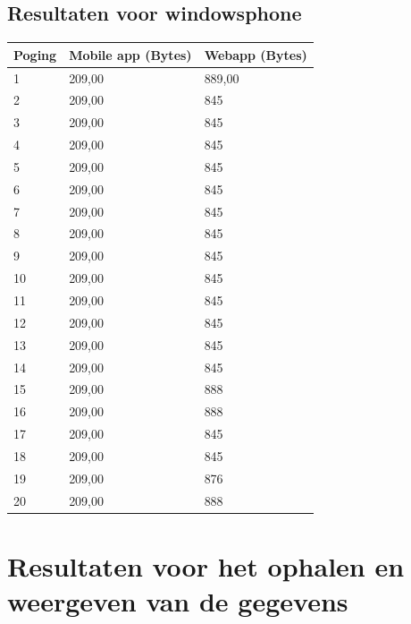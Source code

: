 \documentclass[pdftex,a4paper,12pt,twoside]{report}
\begin{document}
\subsection{Resultaten voor windowsphone}
\begin{center}
  \begin{tabular}{ | l | l | l |}
      \hline
      Poging & Mobile app (Bytes) & Webapp (Bytes)
      \\ \hline
      1 & 209,00 & 889,00
      \\ \hline
      2 & 209,00 & 845
      \\ \hline
      3 & 209,00 & 845
      \\ \hline
      4 & 209,00 & 845
      \\ \hline
      5 & 209,00 & 845
      \\ \hline
      6 & 209,00 & 845
      \\ \hline
      7 & 209,00 & 845
      \\ \hline
      8 & 209,00 & 845
      \\ \hline
      9 & 209,00 & 845
      \\ \hline
      10 & 209,00 & 845
      \\ \hline
      11 & 209,00 & 845
      \\ \hline
      12 & 209,00 & 845
      \\ \hline
      13 & 209,00 & 845
      \\ \hline
      14 & 209,00 & 845
      \\ \hline
      15 & 209,00 & 888
      \\ \hline
      16 & 209,00 & 888
      \\ \hline
      17 & 209,00 & 845
      \\ \hline
      18 & 209,00 & 845
      \\ \hline
      19 & 209,00 & 876
      \\ \hline
      20 & 209,00 & 888
      \\ \hline
  \end{tabular}
\end{center}
\newpage
\section{Resultaten voor het ophalen en weergeven van de gegevens}
\end{document}

